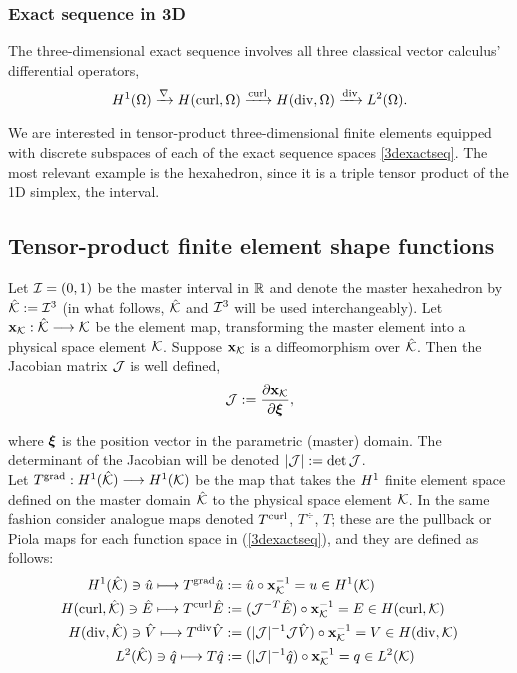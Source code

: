 \subsubsection{Exact sequence in 3D}

The three-dimensional exact sequence involves all three classical vector calculus' differential operators,
% 
\begin{equation}
    H^1(\Omega)\xrightarrow{\nabla}H(\operatorname{curl},\Omega)\xrightarrow{\operatorname{curl}}H(\operatorname{div},\Omega)\xrightarrow{\operatorname{div}}L^2(\Omega).
    \label{3dexactseq}
\end{equation}

We are interested in tensor-product three-dimensional finite elements equipped with discrete subspaces of each of the exact sequence spaces \eqref{3dexactseq}. The most relevant example is the hexahedron, since it is a triple tensor product of the 1D simplex, the interval.

\subsection{Tensor-product finite element shape functions}

Let $\mathcal{I}=(0,1)$ be the master interval in $\mathbb{R}$ and denote the master hexahedron by $\hat{\mathcal{K}}:=\mathcal{I}^3$ (in what follows, $\hat{\mathcal{K}}$ and $\mathcal{I}^3$ will be used interchangeably). Let $\mathbf{x}_{\mathcal{K}}:\hat{\mathcal{K}}\longrightarrow\mathcal{K}$ be the element map, transforming the master element into a physical space element $\mathcal{K}$. Suppose $\mathbf{x}_{\mathcal{K}}$ is a diffeomorphism over $\hat{\mathcal{K}}$. Then the Jacobian matrix $\mathcal{J}$ is well defined,
% 
\begin{equation}
    \mathcal{J}:=\frac{\partial\mathbf{x}_{\mathcal{K}}}{\partial\boldsymbol{\xi}},
\end{equation}

\noindent where $\boldsymbol{\xi}$ is the position vector in the parametric (master) domain. The determinant of the Jacobian will be denoted $|\mathcal{J}|:=\det\mathcal{J}$.\\

Let $T^{\operatorname{grad}}:H^1(\hat{\mathcal{K}})\longrightarrow H^1(\mathcal{K})$ be the map that takes the $H^1$ finite element space defined on the master domain $\hat{\mathcal{K}}$ to the physical space element $\mathcal{K}$. In the same fashion consider analogue maps denoted $T^{\operatorname{curl}}$, $T^{\div}$, $T$; these are the pullback or Piola maps for each function space in (\ref{3dexactseq}), and they are defined as follows:
% 
\begin{align}
    H^1(\hat{\mathcal{K}})\ni \hat{u} \longmapsto T^{\operatorname{grad}}\hat{u}&:=\hat{u}\circ\mathbf{x}_{\mathcal{K}}^{-1}=u\in H^1(\mathcal{K})\label{piolah1} \\
    H(\operatorname{curl},\hat{\mathcal{K}})\ni \hat{E} \longmapsto T^{\operatorname{curl}}\hat{E}&:=(\mathcal{J}^{-T}\hat{E})\circ\mathbf{x}_{\mathcal{K}}^{-1}=E\in H(\operatorname{curl},\mathcal{K})\label{piolahcurl} \\
    H(\operatorname{div},\hat{\mathcal{K}})\ni \hat{V} \longmapsto T^{\operatorname{div}}\hat{V}&:=(|\mathcal{J}|^{-1}\mathcal{J}\hat{V})\circ\mathbf{x}_{\mathcal{K}}^{-1}=V\in H(\operatorname{div},\mathcal{K})\label{piolahdiv} \\
    L^2(\hat{\mathcal{K}})\ni \hat{q} \longmapsto T\hat{q}&:=(|\mathcal{J}|^{-1}\hat{q})\circ\mathbf{x}_{\mathcal{K}}^{-1}=q\in L^2(\mathcal{K})\label{piolal2}
\end{align}

